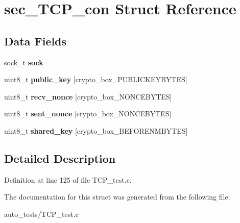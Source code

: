 \hypertarget{structsec___t_c_p__con}{\section{sec\+\_\+\+T\+C\+P\+\_\+con Struct Reference}
\label{structsec___t_c_p__con}
}
\subsection*{Data Fields}
\begin{DoxyCompactItemize}
\item 
\hypertarget{structsec___t_c_p__con_a35b19d84fb632ca8ce5cab237f7089a5}{sock\+\_\+t {\bfseries sock}}\label{structsec___t_c_p__con_a35b19d84fb632ca8ce5cab237f7089a5}

\item 
\hypertarget{structsec___t_c_p__con_aaa806bb1136fb3d4b5d8d8970b596ff7}{uint8\+\_\+t {\bfseries public\+\_\+key} \mbox{[}crypto\+\_\+box\+\_\+\+P\+U\+B\+L\+I\+C\+K\+E\+Y\+B\+Y\+T\+E\+S\mbox{]}}\label{structsec___t_c_p__con_aaa806bb1136fb3d4b5d8d8970b596ff7}

\item 
\hypertarget{structsec___t_c_p__con_aae0467706f97aa3ef23e5dc9c3c199d7}{uint8\+\_\+t {\bfseries recv\+\_\+nonce} \mbox{[}crypto\+\_\+box\+\_\+\+N\+O\+N\+C\+E\+B\+Y\+T\+E\+S\mbox{]}}\label{structsec___t_c_p__con_aae0467706f97aa3ef23e5dc9c3c199d7}

\item 
\hypertarget{structsec___t_c_p__con_a9df0e00e8f493ed6cd1ff45e7da33c0d}{uint8\+\_\+t {\bfseries sent\+\_\+nonce} \mbox{[}crypto\+\_\+box\+\_\+\+N\+O\+N\+C\+E\+B\+Y\+T\+E\+S\mbox{]}}\label{structsec___t_c_p__con_a9df0e00e8f493ed6cd1ff45e7da33c0d}

\item 
\hypertarget{structsec___t_c_p__con_a81ead9fac55a0cedc30a96253a2c5119}{uint8\+\_\+t {\bfseries shared\+\_\+key} \mbox{[}crypto\+\_\+box\+\_\+\+B\+E\+F\+O\+R\+E\+N\+M\+B\+Y\+T\+E\+S\mbox{]}}\label{structsec___t_c_p__con_a81ead9fac55a0cedc30a96253a2c5119}

\end{DoxyCompactItemize}


\subsection{Detailed Description}


Definition at line 125 of file T\+C\+P\+\_\+test.\+c.



The documentation for this struct was generated from the following file\+:\begin{DoxyCompactItemize}
\item 
auto\+\_\+tests/T\+C\+P\+\_\+test.\+c\end{DoxyCompactItemize}
